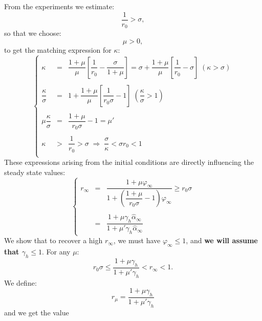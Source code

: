 \documentclass[aps,onecolumn,11pt]{revtex4}
\begin{document}
From the experiments we estimate:
\begin{equation}
\dfrac{1}{r_0}  >  \sigma,
\end{equation}
so that we choose:
\begin{equation}
\mu > 0,
\end{equation}
to get the matching expression for $\kappa$:
\begin{equation}
\left\lbrace
\begin{array}{rcl}
	\kappa  & = &  \dfrac{1+\mu}{\mu}\left[\dfrac{1}{r_0} - \dfrac{\sigma}{1+\mu}\right] 
	=  \sigma + {\dfrac{1+\mu}{\mu}\left[ \dfrac{1}{r_0} - \sigma \right]} \; (\kappa>\sigma)\\
	\\
	\dfrac{\kappa}{\sigma} & = & 1 + {\dfrac{1+\mu}{\mu}\left[ \dfrac{1}{r_0\sigma} - 1\right]} \; \left(\dfrac{\kappa}{\sigma}> 1\right)\\
	\\
	\mu \dfrac{\kappa}{\sigma} & = & \dfrac{1+\mu}{r_0\sigma} - 1 = \mu'\\
	\\
 \kappa & > & \dfrac{1}{r_0} > \sigma \;\Rightarrow\; \dfrac{\sigma}{\kappa} < \sigma r_0  < 1\\
\end{array}
\right.
\end{equation}
These expressions arising from the initial conditions are directly influencing the steady state values:
\begin{equation}
\label{eq:r_ss}
\left\lbrace
\begin{array}{rcl}
	r_\infty & = & \dfrac{1+\mu \varphi_\infty}{1+\left(\dfrac{1+\mu}{r_0\sigma} - 1\right)\varphi_\infty} \geq r_0 \sigma\\
	\\
	& = & \dfrac{1+\mu \gamma_h \hat\alpha_\infty}{1+\mu'\gamma_h \hat\alpha_\infty} 
\end{array}
\right.
\end{equation}
We show that to recover a high $r_\infty$, we must have $\varphi_\infty\leq 1$, and \textbf{we will assume that $\gamma_h\leq1$}.
For any $\mu$:
\begin{equation}
	r_0\sigma \leq \dfrac{1+\mu\gamma_h}{1+\mu' \gamma_h} < r_\infty < 1.
\end{equation}
We define:
\begin{equation}
	r_\mu = \dfrac{1+\mu\gamma_h}{1+\mu' \gamma_h}
\end{equation}
and we get the value
\end{document}

